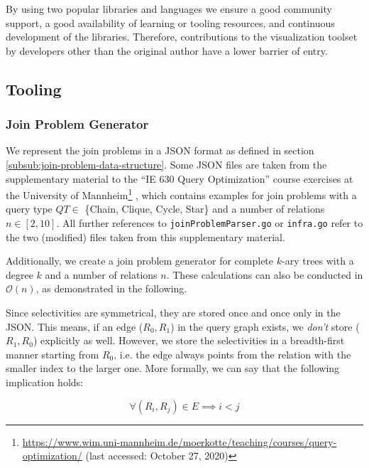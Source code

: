 By using two popular libraries and languages we ensure a good community support, a good availability of learning or tooling resources, and continuous development of the libraries. Therefore, contributions to the visualization toolset by developers other than the original author have a lower barrier of entry.


\subsection{Tooling}

\subsubsection{Join Problem Generator}
We represent the join problems in a JSON format as defined in section \ref{subsub:join-problem-data-structure}. 
Some JSON files are taken from the supplementary material to the ``IE 630 Query Optimization'' course exercises at the University of Mannheim\footnote{\url{https://www.wim.uni-mannheim.de/moerkotte/teaching/courses/query-optimization/} (last accessed: October 27, 2020)}
, which contains examples for join problems with a query type $QT \in $ \{Chain, Clique, Cycle, Star\} and a number of relations $n \in [2,10]$. All further references to \texttt{joinProblemParser.go} or \texttt{infra.go} refer to the two (modified) files taken from this supplementary material.

Additionally, we create a join problem generator for complete $k$-ary trees with a degree $k$ and a number of relations $n$. These calculations can also be conducted in $\mathcal{O}(n)$, as demonstrated in the following.

Since selectivities are symmetrical, they are stored once and once only in the JSON. This means, if an edge ($R_0, R_1$) in the query graph exists, we \textit{don't} store ($R_1, R_0$) explicitly as well. However, we store the selectivities in a breadth-first manner starting from $R_0$, i.e. the edge always points from the relation with the smaller index to the larger one. More formally, we can say that the following implication holds:

\begin{equation}
    \forall (R_i, R_j) \in E \implies i < j
\label{eq:bfs-implication}
\end{equation}

